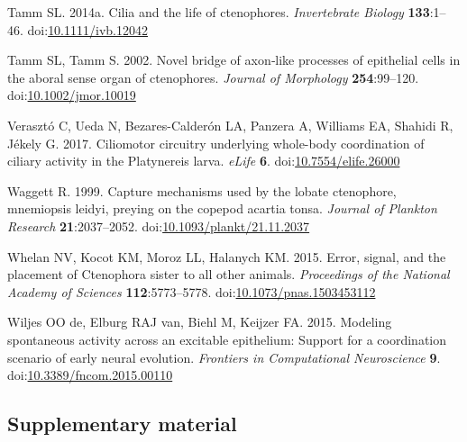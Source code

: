 \documentclass[
  11pt,
]{article}
\newlength{\cslhangindent}
\newenvironment{CSLReferences}[2] %
 {\begin{list}{}{%
  \setlength{\itemindent}{0pt}
  \setlength{\leftmargin}{0pt}
  \setlength{\parsep}{0pt}
  \ifodd #1
   \setlength{\leftmargin}{\cslhangindent}
   \setlength{\itemindent}{-1\cslhangindent}
  \fi
  \setlength{\itemsep}{#2\baselineskip}}}
 {\end{list}}
\begin{document}
\begin{CSLReferences}{1}{0}
Tamm SL. 2014a. Cilia and the life of ctenophores. \emph{Invertebrate
Biology} \textbf{133}:1--46.
doi:\href{https://doi.org/10.1111/ivb.12042}{10.1111/ivb.12042}

Tamm SL, Tamm S. 2002. Novel bridge of axon‐like processes of epithelial
cells in the aboral sense organ of ctenophores. \emph{Journal of
Morphology} \textbf{254}:99--120.
doi:\href{https://doi.org/10.1002/jmor.10019}{10.1002/jmor.10019}

Verasztó C, Ueda N, Bezares-Calderón LA, Panzera A, Williams EA, Shahidi
R, Jékely G. 2017. Ciliomotor circuitry underlying whole-body
coordination of ciliary activity in the Platynereis larva. \emph{eLife}
\textbf{6}.
doi:\href{https://doi.org/10.7554/elife.26000}{10.7554/elife.26000}

Waggett R. 1999. Capture mechanisms used by the lobate ctenophore,
mnemiopsis leidyi, preying on the copepod acartia tonsa. \emph{Journal
of Plankton Research} \textbf{21}:2037--2052.
doi:\href{https://doi.org/10.1093/plankt/21.11.2037}{10.1093/plankt/21.11.2037}

Whelan NV, Kocot KM, Moroz LL, Halanych KM. 2015. Error, signal, and the
placement of Ctenophora sister to all other animals. \emph{Proceedings
of the National Academy of Sciences} \textbf{112}:5773--5778.
doi:\href{https://doi.org/10.1073/pnas.1503453112}{10.1073/pnas.1503453112}

Wiljes OO de, Elburg RAJ van, Biehl M, Keijzer FA. 2015. Modeling
spontaneous activity across an excitable epithelium: Support for a
coordination scenario of early neural evolution. \emph{Frontiers in
Computational Neuroscience} \textbf{9}.
doi:\href{https://doi.org/10.3389/fncom.2015.00110}{10.3389/fncom.2015.00110}

\end{CSLReferences}

\newpage

\subsection*{Supplementary material}\label{supplementary-material}
\end{document}
